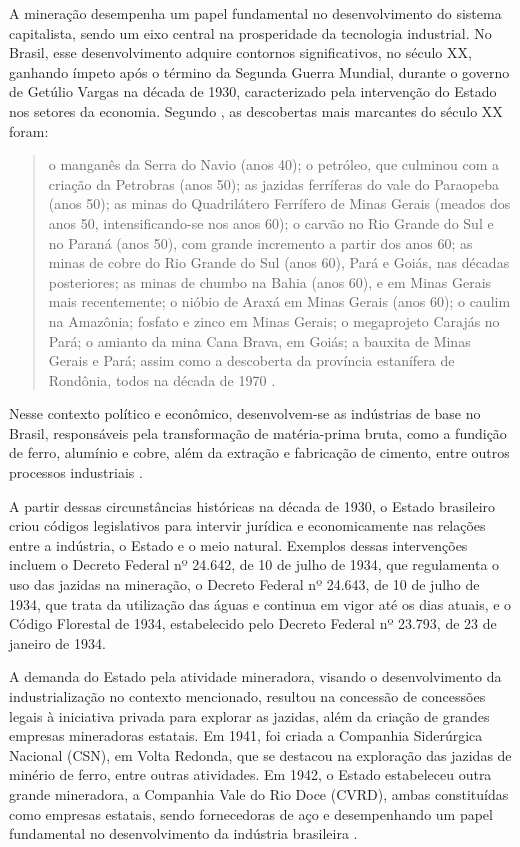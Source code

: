 A mineração desempenha um papel fundamental no desenvolvimento do sistema capitalista, sendo um eixo central na prosperidade da tecnologia industrial. No Brasil, esse desenvolvimento adquire contornos significativos, no século XX, ganhando ímpeto após o término da Segunda Guerra Mundial, durante o governo de Getúlio Vargas na década de 1930, caracterizado pela intervenção do Estado nos setores da economia. Segundo \citeauthor{barreto2001mineracao}, as descobertas mais marcantes do século XX foram:

\begin{quotation}
o manganês da Serra do Navio (anos 40); o petróleo, que culminou com a criação da Petrobras (anos 50); as jazidas ferríferas do vale do Paraopeba (anos 50); as minas do Quadrilátero Ferrífero de Minas Gerais (meados dos anos 50, intensificando-se nos anos 60); o carvão no Rio Grande do Sul e no Paraná (anos 50), com grande incremento a partir dos anos 60; as minas de cobre do Rio Grande do Sul (anos 60), Pará e Goiás, nas décadas posteriores; as minas de chumbo na Bahia (anos 60), e em Minas Gerais mais recentemente; o nióbio de Araxá em Minas Gerais (anos 60); o caulim na Amazônia; fosfato e zinco em Minas Gerais; o megaprojeto Carajás no Pará; o amianto da mina Cana Brava, em Goiás; a bauxita de Minas Gerais e Pará; assim como a descoberta da província estanífera de Rondônia, todos na década de 1970 \cite[p. 6]{barreto2001mineracao}.
\end{quotation}

Nesse contexto político e econômico, desenvolvem-se as indústrias de base no Brasil, responsáveis pela transformação de matéria-prima bruta, como a fundição de ferro, alumínio e cobre, além da extração e fabricação de cimento, entre outros processos industriais \cite[p. 7]{domingues2022historia}.

A partir dessas circunstâncias históricas na década de 1930, o Estado brasileiro criou códigos legislativos para intervir jurídica e economicamente nas relações entre a indústria, o Estado e o meio natural. Exemplos dessas intervenções incluem o Decreto Federal nº 24.642, de 10 de julho de 1934, que regulamenta o uso das jazidas na mineração, o Decreto Federal nº 24.643, de 10 de julho de 1934, que trata da utilização das águas e continua em vigor até os dias atuais, e o Código Florestal de 1934, estabelecido pelo Decreto Federal nº 23.793, de 23 de janeiro de 1934.

A demanda do Estado pela atividade mineradora, visando o desenvolvimento da industrialização no contexto mencionado, resultou na concessão de concessões legais à iniciativa privada para explorar as jazidas, além da criação de grandes empresas mineradoras estatais. Em 1941, foi criada a Companhia Siderúrgica Nacional (CSN), em Volta Redonda, que se destacou na exploração das jazidas de minério de ferro, entre outras atividades. Em 1942, o Estado estabeleceu outra grande mineradora, a Companhia Vale do Rio Doce (CVRD), ambas constituídas como empresas estatais, sendo fornecedoras de aço e desempenhando um papel fundamental no desenvolvimento da indústria brasileira \cite[p. 8]{domingues2022historia}.

